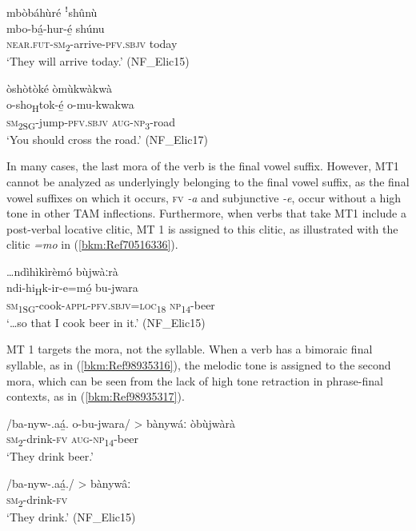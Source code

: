 \ea
\label{bkm:Ref70516266}
mbòbáhùré ꜝshûnù\\
\gll mbo-bá̲-hur-é̲      shúnu\\
\textsc{near}.\textsc{fut}-\textsc{sm}\textsubscript{2}-arrive-\textsc{pfv}.\textsc{sbjv}  today\\
\glt ‘They will arrive today.’ (NF\_Elic15)
\z

\ea
\label{bkm:Ref70516275}
òshòtòké òmùkwàkwà\\
\gll o-sho\textsubscript{H}tok-é̲      o-mu-kwakwa\\
\textsc{sm}\textsubscript{2SG}-jump-\textsc{pfv}.\textsc{sbjv}  \textsc{aug}-\textsc{np}\textsubscript{3}-road\\
\glt ‘You should cross the road.’ (NF\_Elic17)
\z

In many cases, the last mora of the verb is the final vowel suffix. However, MT1 cannot be analyzed as underlyingly belonging to the final vowel suffix, as the final vowel suffixes on which it occurs, \textsc{fv} \textit{-a} and subjunctive \textit{-e}, occur without a high tone in other TAM inflections. Furthermore, when verbs that take MT1 include a post-verbal locative clitic, MT 1 is assigned to this clitic, as illustrated with the clitic \textit{=mo} in (\ref{bkm:Ref70516336}).

\ea
\label{bkm:Ref70516336}
…ndìhìkìrèmó bùjwàːrà\\
\gll ndi-hi\textsubscript{H}k-ir-e=mó̲      bu-jwara\\
\textsc{sm}\textsubscript{1SG}-cook-\textsc{appl}-\textsc{pfv}.\textsc{sbjv}=\textsc{loc}\textsubscript{18}  \textsc{np}\textsubscript{14}-beer\\
\glt ‘…so that I cook beer in it.’ (NF\_Elic15)
\z

MT 1 targets the mora, not the syllable. When a verb has a bimoraic final syllable, as in (\ref{bkm:Ref98935316}), the melodic tone is assigned to the second mora, which can be seen from the lack of high tone retraction in phrase-final contexts, as in (\ref{bkm:Ref98935317}).

\ea
\label{bkm:Ref98935316}
\gll /ba-nyw-.aá̲.    o-bu-jwara/ > bànywáː òbùjwàrà\\
\textsc{sm}\textsubscript{2}-drink-\textsc{fv}    \textsc{aug}-\textsc{np}\textsubscript{14}-beer\\
\glt ‘They drink beer.’
\z

\ea
\label{bkm:Ref98935317}
\gll /ba-nyw-.aá̲./ > bànywâː\\
\textsc{sm}\textsubscript{2}-drink-\textsc{fv}\\
\glt ‘They drink.’ (NF\_Elic15)
\z

